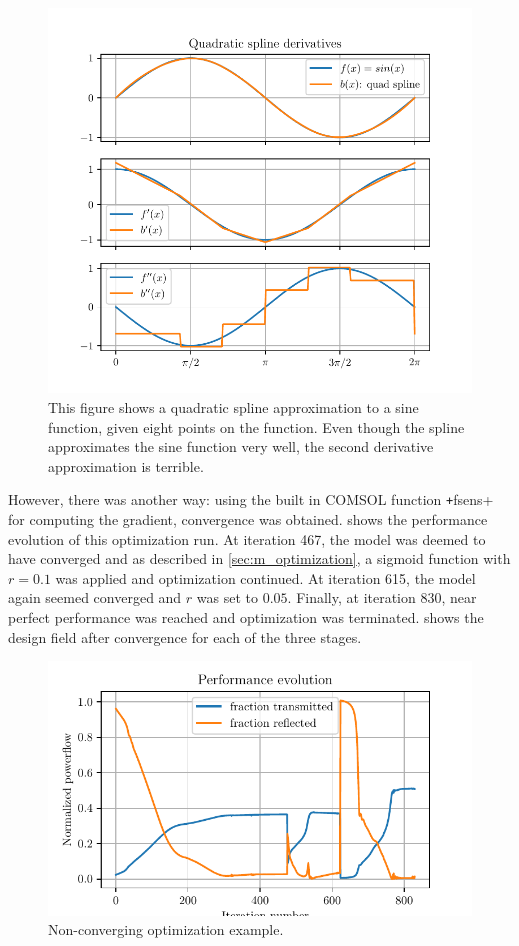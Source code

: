 \begin{figure}[htpb]
	\centering
	\includegraphics{chapters/results/quad_spline_sine.pdf}
	\caption{%
		This figure shows a quadratic spline approximation to a sine function,
		given eight points on the function. Even though the spline approximates
		the sine function very well, the second derivative approximation is
		terrible.
	}
	\label{fig:quad_spline_sine}
\end{figure}

However, there was another way:
using the built in COMSOL function \texttt+fsens+ for computing
the gradient, convergence was obtained.
 shows the performance evolution of this optimization run.
At iteration 467, the model was deemed to have converged and as described in
\cref{sec:m_optimization}, a sigmoid function with $r=0.1$ was applied and optimization
continued.
At iteration 615, the model again seemed converged and $r$ was set to $0.05$.
Finally, at iteration 830, near perfect performance was reached and optimization
was terminated.
 shows the design field after convergence for each of the
three stages.

\begin{figure}[htpb]
	\centering
	\includegraphics{chapters/results/conv_22.pdf}
	\caption{
		Non-converging optimization example.
	}
	\label{fig:bad_cont_conv}
\end{figure}

